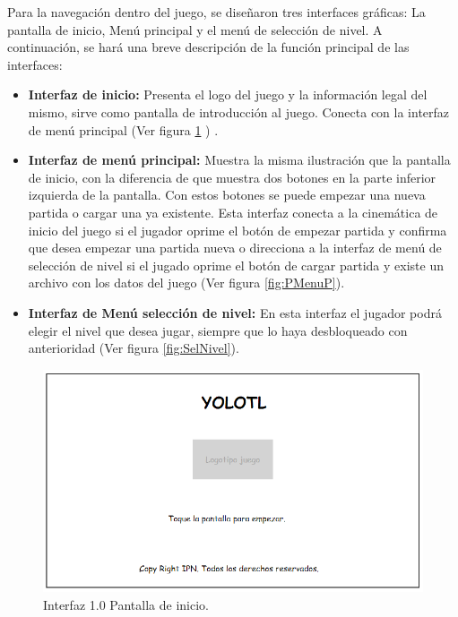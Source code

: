 Para la navegación dentro del juego, se diseñaron tres interfaces gráficas: La pantalla de inicio, Menú principal y el menú de selección de nivel. A continuación, se hará una breve descripción de la función principal de las interfaces:
\begin{itemize}
	\item\textbf{ Interfaz de inicio:} Presenta el logo del juego y la información legal del mismo, sirve como pantalla de introducción al juego. Conecta con la interfaz de menú principal (Ver figura \ref{fig:PInicio} ) .
	\item \textbf{Interfaz de menú principal:} Muestra la misma ilustración que la pantalla de inicio, con la diferencia de que muestra dos botones en la parte inferior izquierda de la pantalla. Con estos botones se puede empezar una nueva partida o cargar una ya existente. Esta interfaz conecta a la cinemática de inicio del juego si el jugador oprime el botón de empezar partida y confirma que desea empezar una partida nueva o direcciona a la interfaz de menú de selección de nivel si el jugado oprime el botón de cargar partida y existe un archivo con los datos del juego (Ver figura \ref{fig:PMenuP}).
	\item \textbf{Interfaz de Menú selección de nivel:} En esta interfaz el jugador podrá elegir el nivel que desea jugar, siempre que lo haya desbloqueado con anterioridad (Ver figura \ref{fig:SelNivel}).
\end{itemize}

\begin{figure}
  \centering
   \includegraphics[width=0.6 \textwidth]{05TrabajoRealizado/01DocDiseno02/imagenes/interfaz00}
  \caption{Interfaz 1.0 Pantalla de inicio.}
  \label{fig:PInicio}
\end{figure} 


